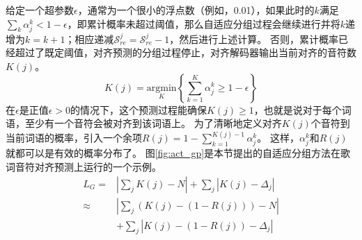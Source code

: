 给定一个超参数$\epsilon$，通常为一个很小的浮点数（例如，0.01），如果此时的$k$满足$\sum_k \alpha_j^k < 1-\epsilon$，即累计概率未超过阈值，那么自适应分组过程会继续进行并将$k$递增为$k=k+1$；相应递减$\mathcal{S}_{re}^j=\mathcal{S}_{re}^j-1$，然后进行上述计算。
否则，累计概率已经超过了既定阈值，对齐预测的分组过程停止，对齐解码器输出当前对齐的音符数$K(j)$。
\begin{equation}
\label{eq:Kj}
    K(j) = \underset{K}{\mathrm{argmin}} \left\{\sum_{k=1}^K \alpha_j^k \geq 1-\epsilon \right\}
\end{equation}
在$\epsilon$是正值$\epsilon>0$的情况下，这个预测过程能确保$K(j)\geq1$，也就是说对于每个词语，至少有一个音符会被对齐到该词语上。
为了清晰地定义对齐$K(j)$个音符到当前词语的概率，引入一个余项$R(j) = 1-\sum_{k=1}^{K(j)-1} \alpha_j^k$。
这样，$\alpha_j^k$和$R(j)$就都可以是有效的概率分布了。
图\ref{fig:act_gp}是本节提出的自适应分组方法在歌词音符对齐预测上运行的一个示例。
\begin{equation}
\begin{array}{rl}
    L_G = & \left| \sum_j K(j) - N \right| + \sum_j \left|K(j) - \Delta_j\right| \\
    \approx &\left|\sum_j \left(K(j) - (1 - R(j))\right) - N \right| \\
    & + \sum_j \left|K(j) - (1 - R(j)) - \Delta_j\right|
\end{array}
\end{equation}

